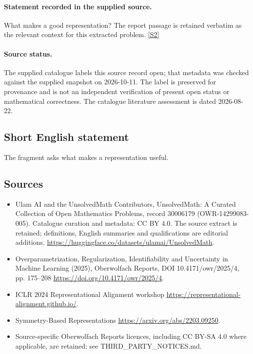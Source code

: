 \documentclass[11pt]{article}
\begin{document}
\paragraph{Statement recorded in the supplied source.}
What makes a good representation? The report passage is retained verbatim as the relevant context for this extracted problem. \href{https://doi.org/10.4171/owr/2025/4}{[S2]}
\paragraph{Source status.}
The supplied catalogue labels this source record open; that metadata was checked against the supplied snapshot on 2026-10-11. The label is preserved for provenance and is not an independent verification of present open status or mathematical correctness. The catalogue literature assessment is dated 2026-08-22.
\subsection{Short English statement}
The fragment asks what makes a representation useful.
\subsection{Sources}
\begin{itemize}
\item[S1] Ulam AI and the UnsolvedMath Contributors, UnsolvedMath: A Curated Collection of Open Mathematics Problems, record 30006179 (OWR-14299083-005). Catalogue curation and metadata: CC BY 4.0. The source extract is retained; definitions, English summaries and qualifications are editorial additions.
\url{https://huggingface.co/datasets/ulamai/UnsolvedMath}.
\item[S2] Overparametrization, Regularization, Identifiability and Uncertainty in Machine Learning (2025), Oberwolfach Reports, DOI 10.4171/owr/2025/4, pp. 175--208
\url{https://doi.org/10.4171/owr/2025/4}.
\item[S3] ICLR 2024 Representational Alignment workshop
\url{https://representational-alignment.github.io/}.
\item[S4] Symmetry-Based Representations
\url{https://arxiv.org/abs/2203.09250}.
\item Source-specific Oberwolfach Reports licences, including CC BY-SA 4.0 where applicable, are retained; see THIRD\_PARTY\_NOTICES.md.
\end{itemize}
\end{document}
